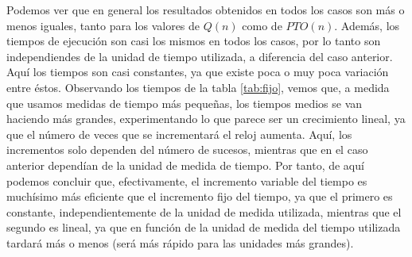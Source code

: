 \documentclass[11pt,a4paper]{article}
\begin{document}
\begin{table}[H]
\caption{Resultados obtenidos por el incremento de tiempo variable.}
\label{tab:var}
\end{table}

Podemos ver que en general los resultados obtenidos en todos los casos son más
o menos iguales, tanto para los valores de $Q(n)$ como de $PTO(n)$. Además, los
tiempos de ejecución son casi los mismos en todos los casos, por lo tanto son
independiendes de la unidad de tiempo utilizada, a diferencia del caso anterior.
Aquí los tiempos son casi constantes, ya que existe poca o muy poca variación entre
éstos. Observando los tiempos de la tabla \ref{tab:fijo}, vemos que, a medida
que usamos medidas de tiempo más pequeñas, los tiempos medios se van haciendo más grandes,
experimentando lo que parece ser un crecimiento lineal, ya que el número de veces
que se incrementará el reloj aumenta. Aquí, los incrementos solo dependen del
número de sucesos, mientras que en el caso anterior dependían de la unidad de
medida de tiempo. Por tanto, de aquí podemos concluir que, efectivamente, el
incremento variable del tiempo es muchísimo más eficiente que el incremento
fijo del tiempo, ya que el primero es constante, independientemente de la unidad
de medida utilizada, mientras que el segundo es lineal, ya que en función de la unidad
de medida del tiempo utilizada tardará más o menos (será más rápido para las unidades
más grandes).
\end{document}
